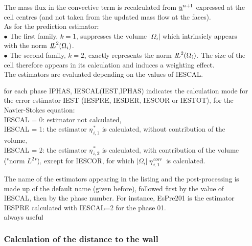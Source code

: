 The mass flux in the convective term is recalculated from $\underline{u}^{n+1}$
expressed at the cell centres (and not taken from the updated mass flow at the
faces).\\

As for the prediction estimator:\\
\hspace*{0.5cm}$\bullet$ The first family, $k=1$, suppresses the
volume $|\Omega_i|$ which intrinsicly appears  with the norm
${{I\hspace{-.25em}L}^{2}(\Omega_i)}$.\\ 
\hspace*{0.5cm}$\bullet$ The second family, $k=2$, exactly represents the norm
${{I\hspace{-.25em}L}^{2}(\Omega_i)}$. The size of the cell therefore
appears in its calculation and induces a weighting effect.\\


The estimators are evaluated depending on the values of IESCAL.
                                       

{for each phase IPHAS, IESCAL(IEST,IPHAS) indicates the calculation mode 
for the error estimator IEST (IESPRE, IESDER, IESCOR or IESTOT), for
the Navier-Stokes equation:\\ 
 IESCAL = 0: estimator not calculated, \\       
 IESCAL = 1: the estimator $ \eta^{\,* }_{\,i,1}$ is calculated,         
               without contribution of the volume, \\ 
 IESCAL = 2: the estimator $ \eta^{\,* }_{\,i,2}$ is calculated,              
               with contribution of the volume ("norm $L^2$"),              
               except for IESCOR, for which
               $|\Omega_i|\ \eta^{\,corr}_{\,i,1}\ $
               is calculated.
 
The name of the estimators appearing in the listing and the post-processing is
made up of the default name (given before), followed first by the value of
IESCAL, then by the phase number. For
instance, EsPre201 is the estimator IESPRE calculated with IESCAL=2 for
the phase 01.\\
always useful}



\subsubsection{Calculation of the distance to the wall}

